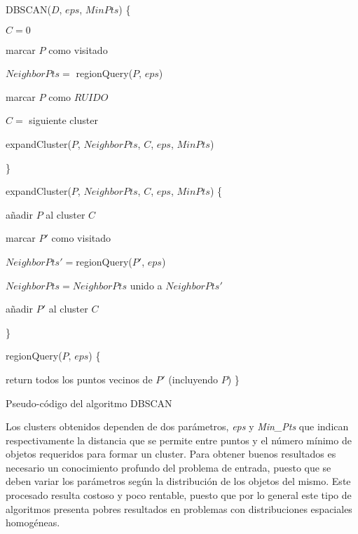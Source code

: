 \begin{algorithm}[H]
DBSCAN($D$, $eps$, $MinPts$) \{

   $C = 0$

    {

      marcar $P$ como visitado

      $NeighborPts =$ regionQuery($P$, $eps$)

       { marcar $P$ como $RUIDO$ } {

         $C =$ siguiente cluster

         expandCluster($P$, $NeighborPts$, $C$, $eps$, $MinPts$)
      }
    }
\}

expandCluster($P$, $NeighborPts$, $C$, $eps$, $MinPts$) \{

  añadir $P$ al cluster $C$

   {%

      {%

       marcar $P'$ como visitado

       $NeighborPts' = $regionQuery($P'$, $eps$)

        {%

         $NeighborPts = NeighborPts$ unido a $NeighborPts'$
       }
     }

      {%

       añadir $P'$ al cluster $C$
     }
   }
\}

regionQuery($P$, $eps$) \{

   return todos los puntos vecinos de $P'$ (incluyendo $P$)
\}

\caption{Pseudo-código del algoritmo DBSCAN}
\label{alg:pseudo-dbscan}
\end{algorithm}

Los clusters obtenidos dependen de dos parámetros, \textit{eps} y \textit{Min\_Pts} que indican respectivamente la
distancia que se permite entre puntos y el número mínimo de objetos requeridos
para formar un cluster. 
Para obtener buenos resultados es necesario un
conocimiento profundo del problema de entrada, puesto que se deben variar los
parámetros según la distribución de los objetos del mismo. Este procesado
resulta costoso y poco rentable, puesto que por lo general este tipo de
algoritmos presenta pobres resultados en problemas con distribuciones espaciales
homogéneas.

